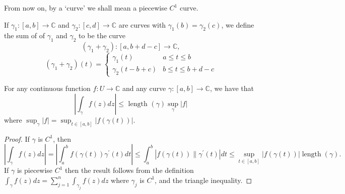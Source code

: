 \documentclass[a4paper]{scrartcl}
\begin{document}
\begin{remark}
      From now on, by a `curve' we shall mean a piecewise $C^{1}$ curve.
\end{remark}
\begin{definition*}
     If $\gamma_{1}:[a, b] \rightarrow \mathbb{C}$ and $\gamma_{2}:[c, d] \rightarrow \mathbb{C}$ are curves with $\gamma_{1}(b)=\gamma_{2}(c)$, we define the sum of of $\gamma_{1}$ and $\gamma_{2}$ to be the curve \[
          \left(\gamma_{1}+\gamma_{2}\right): [a, b+d-c] \rightarrow \mathbb{C}
     ,\] 
     \begin{equation*}
          \left(\gamma_{1}+\gamma_{2}\right)(t)=
           \begin{cases}
               \gamma_{1}(t) & a \leq t \leq b \\
               \gamma_{2}(t-b+c) & b \leq t \leq b+d-c
          \end{cases}
     \end{equation*}
\end{definition*}
\begin{proposition}
     For any continuous function $f: U \rightarrow \mathbb{C}$ and any curve $\gamma:[a, b] \rightarrow \mathbb{C}$, we have that
     $$
     \left|\int_{\gamma} f(z) d z\right| \leq \text { length }(\gamma) \sup _{\gamma}|f|
     $$
     where $\sup _{\gamma}|f|=\sup _{t \in[a, b]}|f(\gamma(t))|$.
\end{proposition}
\begin{proof}
     If $\gamma$ is $C^{1}$, then \[
          \left|\int_{\gamma} f(z) d z\right|=\left|\int_{a}^{b} f(\gamma(t)) \gamma^{\prime}(t) d t\right| \leq
          \int_{a}^{b}\left|f(\gamma(t)) \| \gamma^{\prime}(t)\right| d t \leq \sup _{t \in[a, b]}|f(\gamma(t))|\operatorname{length}(\gamma)
     .\] If $\gamma$ is piecewise $C^{1}$ then the result follows from the definition $\int_{\gamma} f(z) d z=\sum_{j=1}^{n} \int_{\gamma_{j}} f(z) d z$ where $\gamma_{j}$ is $C^{1}$, and the triangle inequality.
\end{proof}
\end{document}
